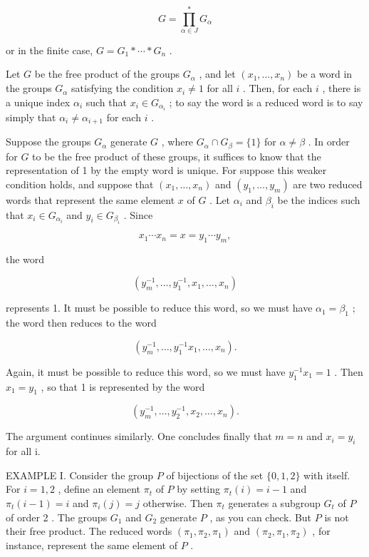 \[
G = \mathop{\prod }\limits_{{\alpha  \in  J}}^{ * }{G}_{\alpha }
\]

or in the finite case, \(G = {G}_{1} * \cdots  * {G}_{n}\) .

Let \(G\) be the free product of the groups \({G}_{\alpha }\) , and let \(\left( {{x}_{1},\ldots ,{x}_{n}}\right)\) be a word in the groups \({G}_{\alpha }\) satisfying the condition \({x}_{i} \neq  1\) for all \(i\) . Then, for each \(i\) , there is a unique index \({\alpha }_{i}\) such that \({x}_{i} \in  {G}_{{\alpha }_{i}}\) ; to say the word is a reduced word is to say simply that \({\alpha }_{i} \neq  {\alpha }_{i + 1}\) for each \(i\) .

Suppose the groups \({G}_{\alpha }\) generate \(G\) , where \({G}_{\alpha } \cap  {G}_{\beta } = \{ 1\}\) for \(\alpha  \neq  \beta\) . In order for \(G\) to be the free product of these groups, it suffices to know that the representation of 1 by the empty word is unique. For suppose this weaker condition holds, and suppose that \(\left( {{x}_{1},\ldots ,{x}_{n}}\right)\) and \(\left( {{y}_{1},\ldots ,{y}_{m}}\right)\) are two reduced words that represent the same element \(x\) of \(G\) . Let \({\alpha }_{i}\) and \({\beta }_{i}\) be the indices such that \({x}_{i} \in  {G}_{{\alpha }_{i}}\) and \({y}_{i} \in  {G}_{{\beta }_{i}}\) . Since

\[
{x}_{1}\cdots {x}_{n} = x = {y}_{1}\cdots {y}_{m},
\]

the word

\[
\left( {{y}_{m}^{-1},\ldots ,{y}_{1}^{-1},{x}_{1},\ldots ,{x}_{n}}\right)
\]

represents 1. It must be possible to reduce this word, so we must have \({\alpha }_{1} = {\beta }_{1}\) ; the word then reduces to the word

\[
\left( {{y}_{m}^{-1},\ldots ,{y}_{1}^{-1}{x}_{1},\ldots ,{x}_{n}}\right) .
\]

Again, it must be possible to reduce this word, so we must have \({y}_{1}^{-1}{x}_{1} = 1\) . Then \({x}_{1} = {y}_{1}\) , so that 1 is represented by the word

\[
\left( {{y}_{m}^{-1},\ldots ,{y}_{2}^{-1},{x}_{2},\ldots ,{x}_{n}}\right) .
\]

The argument continues similarly. One concludes finally that \(m = n\) and \({x}_{i} = {y}_{i}\) for all i.

EXAMPLE I. Consider the group \(P\) of bijections of the set \(\{ 0,1,2\}\) with itself. For \(i = 1,2\) , define an element \({\pi }_{t}\) of \(P\) by setting \({\pi }_{t}\left( i\right)  = i - 1\) and \({\pi }_{t}\left( {i - 1}\right)  = i\) and \({\pi }_{i}\left( j\right)  = j\) otherwise. Then \({\pi }_{t}\) generates a subgroup \({G}_{t}\) of \(P\) of order 2 . The groups \({G}_{1}\) and \({G}_{2}\) generate \(P\) , as you can check. But \(P\) is not their free product. The reduced words \(\left( {{\pi }_{1},{\pi }_{2},{\pi }_{1}}\right)\) and \(\left( {{\pi }_{2},{\pi }_{1},{\pi }_{2}}\right)\) , for instance, represent the same element of \(P\) .

